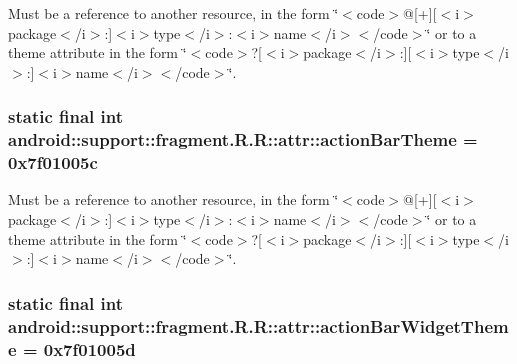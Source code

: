 Must be a reference to another resource, in the form \char`\"{}$<$code$>$@\mbox{[}+\mbox{]}\mbox{[}$<$i$>$package$<$/i$>$:\mbox{]}$<$i$>$type$<$/i$>$:$<$i$>$name$<$/i$>$$<$/code$>$\char`\"{} or to a theme attribute in the form \char`\"{}$<$code$>$?\mbox{[}$<$i$>$package$<$/i$>$:\mbox{]}\mbox{[}$<$i$>$type$<$/i$>$:\mbox{]}$<$i$>$name$<$/i$>$$<$/code$>$\char`\"{}. \hypertarget{classandroid_1_1support_1_1fragment_1_1_r_1_1attr_afb29764f0d20326df921f63afa52b21}{
\subsubsection[{actionBarTheme}]{\setlength{\rightskip}{0pt plus 5cm}static final int android::support::fragment.R.R::attr::actionBarTheme = 0x7f01005c}}
\label{classandroid_1_1support_1_1fragment_1_1_r_1_1attr_afb29764f0d20326df921f63afa52b21}


Must be a reference to another resource, in the form \char`\"{}$<$code$>$@\mbox{[}+\mbox{]}\mbox{[}$<$i$>$package$<$/i$>$:\mbox{]}$<$i$>$type$<$/i$>$:$<$i$>$name$<$/i$>$$<$/code$>$\char`\"{} or to a theme attribute in the form \char`\"{}$<$code$>$?\mbox{[}$<$i$>$package$<$/i$>$:\mbox{]}\mbox{[}$<$i$>$type$<$/i$>$:\mbox{]}$<$i$>$name$<$/i$>$$<$/code$>$\char`\"{}. \hypertarget{classandroid_1_1support_1_1fragment_1_1_r_1_1attr_e103a90b1a586fe41575bfdc2dfe9b6a}{
\subsubsection[{actionBarWidgetTheme}]{\setlength{\rightskip}{0pt plus 5cm}static final int android::support::fragment.R.R::attr::actionBarWidgetTheme = 0x7f01005d}}
\label{classandroid_1_1support_1_1fragment_1_1_r_1_1attr_e103a90b1a586fe41575bfdc2dfe9b6a}


